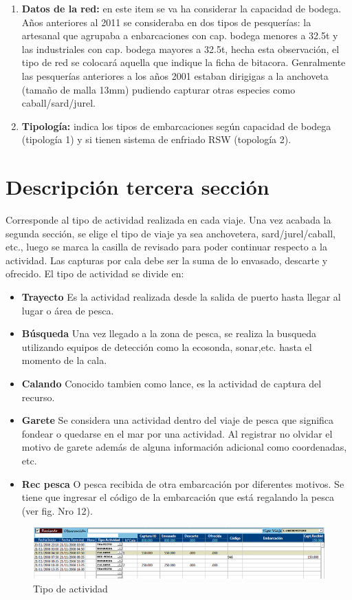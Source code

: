 \documentclass[a4paper,oneside,11pt]{book}
\begin{document}
\begin{enumerate}
\item \textbf{{Datos de la red:}} en este item se va ha considerar la capacidad de bodega. Años anteriores al 2011 se consideraba en dos tipos de pesquerías: la artesanal que agrupaba a enbarcaciones con cap. bodega menores a 32.5t y las industriales con cap. bodega mayores a 32.5t, hecha esta observación, el tipo de red se colocará aquella que indique la ficha de bitacora. Genralmente las pesquerías anteriores a los años 2001 estaban dirigigas a la anchoveta (tamaño de malla 13mm) pudiendo capturar otras especies como caball/sard/jurel.

\item \textbf{{Tipología:}} indica los tipos de embarcaciones según capacidad de bodega (tipología 1) y si tienen sistema de enfriado RSW (topología 2). 

\end{enumerate}


\section{Descripción tercera sección } 
Corresponde al tipo de actividad realizada en cada viaje. Una vez acabada la segunda sección, se elige el tipo de viaje ya sea anchovetera, sard/jurel/caball, etc., luego se marca la casilla de revisado para poder continuar respecto a la actividad. Las capturas por cala debe ser la suma de lo envasado, descarte y ofrecido. El tipo de actividad se divide en:

\begin{itemize}
\item{\textbf{Trayecto}} 
Es la actividad realizada desde la salida de puerto hasta llegar al lugar o área de pesca.
\item{\textbf{Búsqueda}} 
Una vez llegado a la zona de pesca, se realiza la busqueda utilizando equipos de detección como la ecosonda, sonar,etc. hasta el momento de la cala.
\item {\textbf{Calando}} 
Conocido tambien como lance, es la actividad de captura del recurso.
\item{ \textbf{Garete}} 
Se considera una actividad dentro del viaje de pesca que significa fondear o quedarse en el mar por una actividad. Al registrar no olvidar el motivo de garete además de alguna información adicional como coordenadas, etc.

\item{\textbf{Rec pesca}} 
O pesca recibida de otra embarcación por diferentes motivos. Se tiene que ingresar el código de la embarcación que está regalando la pesca (ver fig. Nro 12). 

\end{itemize}
\begin{figure}
\centering
\includegraphics[width=1\linewidth]{./imagen_Manual_PBP/seccion3}
\caption{Tipo de actividad}
\label{fig:seccion3}
\end{figure}
\end{document}
